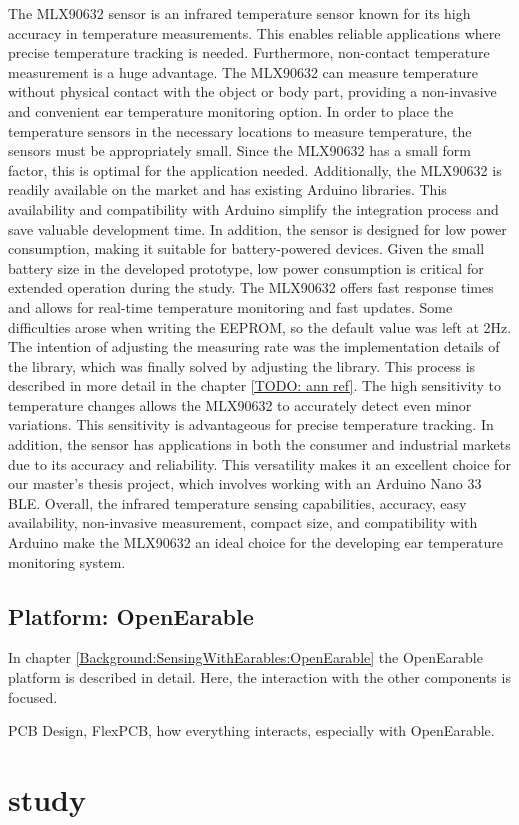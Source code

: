 The MLX90632 sensor is an infrared temperature sensor known for its high accuracy in temperature measurements. This enables reliable applications where precise temperature tracking is needed.
Furthermore, non-contact temperature measurement is a huge advantage. The MLX90632 can measure temperature without physical contact with the object or body part, providing a non-invasive and convenient ear temperature monitoring option.
In order to place the temperature sensors in the necessary locations to measure temperature, the sensors must be appropriately small. Since the MLX90632 has a small form factor, this is optimal for the application needed.
Additionally, the MLX90632 is readily available on the market and has existing Arduino libraries. This availability and compatibility with Arduino simplify the integration process and save valuable development time.
In addition, the sensor is designed for low power consumption, making it suitable for battery-powered devices. Given the small battery size in the developed prototype, low power consumption is critical for extended operation during the study.
The MLX90632 offers fast response times and allows for real-time temperature monitoring and fast updates. Some difficulties arose when writing the EEPROM, so the default value was left at 2Hz.
The intention of adjusting the measuring rate was the implementation details of the library, which was finally solved by adjusting the library. This process is described in more detail in the chapter \ref{TODO: ann ref}.
The high sensitivity to temperature changes allows the MLX90632 to accurately detect even minor variations. This sensitivity is advantageous for precise temperature tracking.
In addition, the sensor has applications in both the consumer and industrial markets due to its accuracy and reliability. This versatility makes it an excellent choice for our master's thesis project, which involves working with an Arduino Nano 33 BLE.
Overall, the infrared temperature sensing capabilities, accuracy, easy availability, non-invasive measurement, compact size, and compatibility with Arduino make the MLX90632 an ideal choice for the developing ear temperature monitoring system.

\subsection{Platform: OpenEarable}

In chapter \ref{Background:SensingWithEarables:OpenEarable} the OpenEarable platform is described in detail. 
Here, the interaction with the other components is focused.



PCB Design, FlexPCB, how everything interacts, especially with OpenEarable.

\section{study}